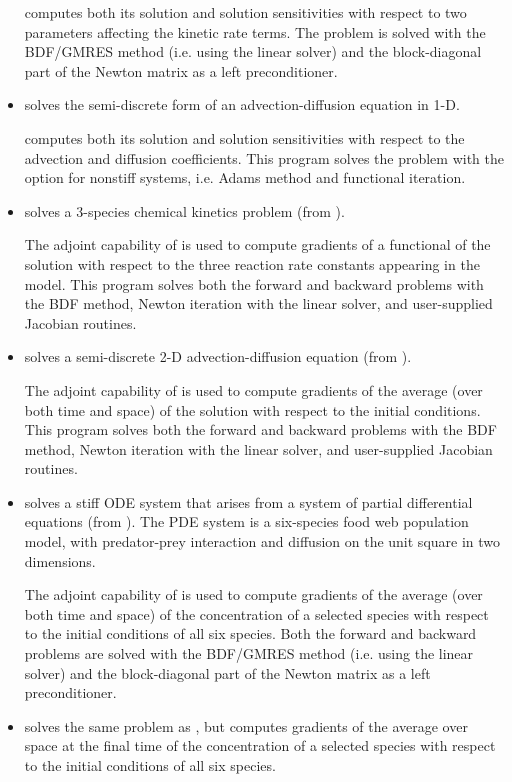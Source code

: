 \begin{itemize}
  {\cvodes} computes both its solution and solution sensitivities with respect
  to two parameters affecting the kinetic rate terms.
  The problem is solved with the BDF/GMRES method (i.e. using the {\cvspgmr}
  linear solver) and the block-diagonal part of the  
  Newton matrix as a left preconditioner.

\item {}
  solves the semi-discrete form of an advection-diffusion equation in 1-D.

  {\cvodes} computes both its solution and solution sensitivities with respect
  to the advection and diffusion coefficients.
  This program solves the problem with the option for nonstiff systems,
  i.e. Adams method and functional iteration.

\item {}
  solves a 3-species chemical kinetics problem (from ).

  The adjoint capability of {\cvodes} is used to compute gradients
  of a functional of the solution with respect to the three
  reaction rate constants appearing in the model.
  This program solves both the forward and backward problems with the BDF method, 
  Newton iteration with the {\cvdense} linear solver, and user-supplied    
  Jacobian routines.

\item {}
  solves a semi-discrete 2-D advection-diffusion equation (from ).

  The adjoint capability of {\cvodes} is used to compute gradients
  of the average (over both time and space) of the solution with respect to
  the initial conditions.
  This program solves both the forward and backward problems with the BDF method, 
  Newton iteration with the {\cvband} linear solver, and user-supplied     
  Jacobian routines.

\item {}
  solves a stiff ODE system that arises from a system of partial differential
  equations (from ).  The PDE system is a six-species
  food web population model, with predator-prey interaction and diffusion 
  on the unit square in two dimensions.

  The adjoint capability of {\cvodes} is used to compute gradients of the
  average (over both time and space) of the concentration of a selected species
  with respect to the initial conditions of all six species.
  Both the forward and backward problems are solved with the BDF/GMRES method 
  (i.e. using the {\cvspgmr} linear solver) and the block-diagonal part of the  
  Newton matrix as a left preconditioner.

\item {}
  solves the same problem as , but computes gradients of the
  average over space at the final time of the concentration of a selected species
  with respect to the initial conditions of all six species.

\end{itemize}

